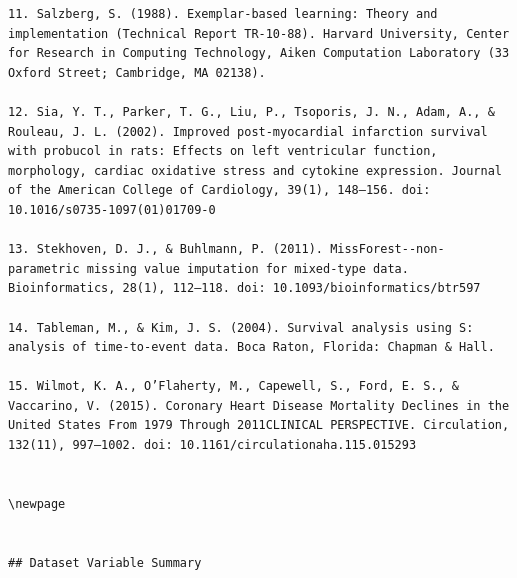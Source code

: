 \documentclass[
]{article}
\begin{document}
\begin{verbatim}
11. Salzberg, S. (1988). Exemplar-based learning: Theory and implementation (Technical Report TR-10-88). Harvard University, Center for Research in Computing Technology, Aiken Computation Laboratory (33 Oxford Street; Cambridge, MA 02138).

12. Sia, Y. T., Parker, T. G., Liu, P., Tsoporis, J. N., Adam, A., & Rouleau, J. L. (2002). Improved post-myocardial infarction survival with probucol in rats: Effects on left ventricular function, morphology, cardiac oxidative stress and cytokine expression. Journal of the American College of Cardiology, 39(1), 148–156. doi: 10.1016/s0735-1097(01)01709-0

13. Stekhoven, D. J., & Buhlmann, P. (2011). MissForest--non-parametric missing value imputation for mixed-type data. Bioinformatics, 28(1), 112–118. doi: 10.1093/bioinformatics/btr597 

14. Tableman, M., & Kim, J. S. (2004). Survival analysis using S: analysis of time-to-event data. Boca Raton, Florida: Chapman & Hall.

15. Wilmot, K. A., O’Flaherty, M., Capewell, S., Ford, E. S., & Vaccarino, V. (2015). Coronary Heart Disease Mortality Declines in the United States From 1979 Through 2011CLINICAL PERSPECTIVE. Circulation, 132(11), 997–1002. doi: 10.1161/circulationaha.115.015293


\newpage


## Dataset Variable Summary



\end{verbatim}
\end{document}
